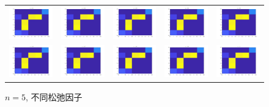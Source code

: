 \documentclass[UTF8,10.5pt,a4paper]{ctexart}
\theoremstyle{definition}
\theoremstyle{definition}
\begin{document}
\begin{figure}[htbp]
	\renewcommand{\captionfont}{\small}
	\centering
	\begin{tabular}{@{}ccccc@{}}
		\includegraphics[width=.18\textwidth]{alpha1n5.jpg} & 
		\includegraphics[width=.18\textwidth]{alpha2n5.jpg} & 
		\includegraphics[width=.18\textwidth]{alpha3n5.jpg} & 
		\includegraphics[width=.18\textwidth]{alpha4n5.jpg} & 
		\includegraphics[width=.18\textwidth]{alpha5n5.jpg}\\
		\includegraphics[width=.18\textwidth]{alpha6n5.jpg} & 
		\includegraphics[width=.18\textwidth]{alpha7n5.jpg} &
		\includegraphics[width=.18\textwidth]{alpha8n5.jpg} & 
		\includegraphics[width=.18\textwidth]{alpha9n5.jpg} & 
		\includegraphics[width=.18\textwidth]{alpha10n5.jpg}
	\end{tabular}
	\caption{$n=5$, 不同松弛因子}
	\label{alphan5figure}
\end{figure}
\end{document}
